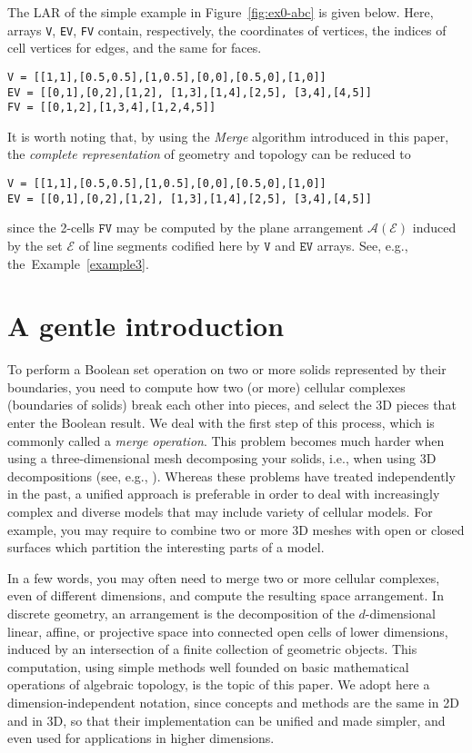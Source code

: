 \begin{example} %
{
The LAR of the simple example in Figure~\ref{fig:ex0-abc} is given below. Here, arrays \texttt{V}, \texttt{EV}, \texttt{FV} contain, respectively, the coordinates of vertices, the indices of cell vertices for edges, and the same  for faces.}
\begin{verbatim}
V = [[1,1],[0.5,0.5],[1,0.5],[0,0],[0.5,0],[1,0]]
EV = [[0,1],[0,2],[1,2], [1,3],[1,4],[2,5], [3,4],[4,5]]
FV = [[0,1,2],[1,3,4],[1,2,4,5]]
\end{verbatim}
{
It is worth noting that, by using the \emph{Merge} algorithm introduced in this paper, the \emph{{complete representation}} of geometry and topology can be reduced to }
\begin{verbatim}
V = [[1,1],[0.5,0.5],[1,0.5],[0,0],[0.5,0],[1,0]]
EV = [[0,1],[0,2],[1,2], [1,3],[1,4],[2,5], [3,4],[4,5]]
\end{verbatim}
{
since the 2-cells $\texttt{FV}$ may {be computed by} the plane arrangement $\mathcal{A}(\mathcal{E})$ induced by the set $\mathcal{E}$ of line segments codified here by $\texttt{V}$ and $\texttt{EV}$ arrays. See, e.g., the~Example~\ref{example3}.}
\end{example}

\section{A gentle introduction}
\label{sec:gentle-intro}


{To perform a Boolean set operation on two or more solids represented by their boundaries,} you need to compute how two (or more) cellular complexes (boundaries of solids) break each other into pieces, and select the 3D pieces that enter the Boolean result. {We deal with the first step of this process, which is commonly called a \emph{merge operation}. } This problem becomes much harder when using a three-dimensional mesh decomposing your solids, i.e., when using 3D decompositions (see, e.g., \cite{Dobkin:1987:PMT:41958.41967}). {Whereas these problems have treated independently in the past,  a unified approach is preferable in order to deal with increasingly complex and diverse models that may include variety of cellular models.   For example,} you may require to combine two or more 3D meshes with open or closed surfaces which partition the interesting parts of a model.

In a few words, you may often need to merge two or more cellular complexes, even of different dimensions, and compute the resulting space arrangement. In discrete geometry, an arrangement is the decomposition of the $d$-dimensional linear, affine, or projective space into connected open cells of lower dimensions, induced {by an intersection of a} finite collection of geometric objects.
This computation, using simple methods well founded on basic mathematical operations of algebraic topology, is the topic of this paper. {We} adopt here a dimension-independent notation, since concepts and methods are the same in 2D and in 3D, so that their implementation can be unified and made simpler, and even used for applications in higher dimensions.

